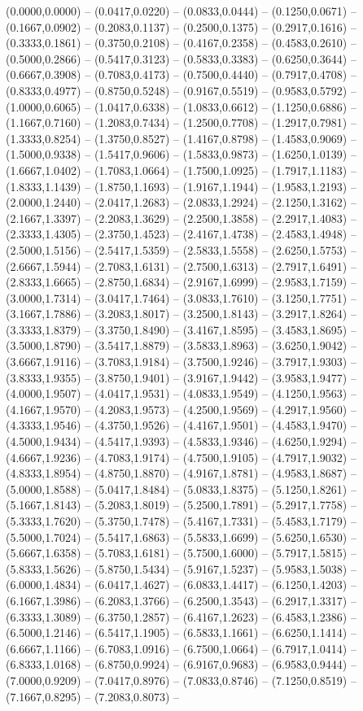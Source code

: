  (0.0000,0.0000) -- (0.0417,0.0220) -- (0.0833,0.0444) -- (0.1250,0.0671) -- (0.1667,0.0902) -- (0.2083,0.1137) -- (0.2500,0.1375) -- (0.2917,0.1616) -- (0.3333,0.1861) -- (0.3750,0.2108) -- (0.4167,0.2358) -- (0.4583,0.2610) -- (0.5000,0.2866) -- (0.5417,0.3123) -- (0.5833,0.3383) -- (0.6250,0.3644) -- (0.6667,0.3908) -- (0.7083,0.4173) -- (0.7500,0.4440) -- (0.7917,0.4708) -- (0.8333,0.4977) -- (0.8750,0.5248) -- (0.9167,0.5519) -- (0.9583,0.5792) -- (1.0000,0.6065) -- (1.0417,0.6338) -- (1.0833,0.6612) -- (1.1250,0.6886) -- (1.1667,0.7160) -- (1.2083,0.7434) -- (1.2500,0.7708) -- (1.2917,0.7981) -- (1.3333,0.8254) -- (1.3750,0.8527) -- (1.4167,0.8798) -- (1.4583,0.9069) -- (1.5000,0.9338) -- (1.5417,0.9606) -- (1.5833,0.9873) -- (1.6250,1.0139) -- (1.6667,1.0402) -- (1.7083,1.0664) -- (1.7500,1.0925) -- (1.7917,1.1183) -- (1.8333,1.1439) -- (1.8750,1.1693) -- (1.9167,1.1944) -- (1.9583,1.2193) -- (2.0000,1.2440) -- (2.0417,1.2683) -- (2.0833,1.2924) -- (2.1250,1.3162) -- (2.1667,1.3397) -- (2.2083,1.3629) -- (2.2500,1.3858) -- (2.2917,1.4083) -- (2.3333,1.4305) -- (2.3750,1.4523) -- (2.4167,1.4738) -- (2.4583,1.4948) -- (2.5000,1.5156) -- (2.5417,1.5359) -- (2.5833,1.5558) -- (2.6250,1.5753) -- (2.6667,1.5944) -- (2.7083,1.6131) -- (2.7500,1.6313) -- (2.7917,1.6491) -- (2.8333,1.6665) -- (2.8750,1.6834) -- (2.9167,1.6999) -- (2.9583,1.7159) -- (3.0000,1.7314) -- (3.0417,1.7464) -- (3.0833,1.7610) -- (3.1250,1.7751) -- (3.1667,1.7886) -- (3.2083,1.8017) -- (3.2500,1.8143) -- (3.2917,1.8264) -- (3.3333,1.8379) -- (3.3750,1.8490) -- (3.4167,1.8595) -- (3.4583,1.8695) -- (3.5000,1.8790) -- (3.5417,1.8879) -- (3.5833,1.8963) -- (3.6250,1.9042) -- (3.6667,1.9116) -- (3.7083,1.9184) -- (3.7500,1.9246) -- (3.7917,1.9303) -- (3.8333,1.9355) -- (3.8750,1.9401) -- (3.9167,1.9442) -- (3.9583,1.9477) -- (4.0000,1.9507) -- (4.0417,1.9531) -- (4.0833,1.9549) -- (4.1250,1.9563) -- (4.1667,1.9570) -- (4.2083,1.9573) -- (4.2500,1.9569) -- (4.2917,1.9560) -- (4.3333,1.9546) -- (4.3750,1.9526) -- (4.4167,1.9501) -- (4.4583,1.9470) -- (4.5000,1.9434) -- (4.5417,1.9393) -- (4.5833,1.9346) -- (4.6250,1.9294) -- (4.6667,1.9236) -- (4.7083,1.9174) -- (4.7500,1.9105) -- (4.7917,1.9032) -- (4.8333,1.8954) -- (4.8750,1.8870) -- (4.9167,1.8781) -- (4.9583,1.8687) -- (5.0000,1.8588) -- (5.0417,1.8484) -- (5.0833,1.8375) -- (5.1250,1.8261) -- (5.1667,1.8143) -- (5.2083,1.8019) -- (5.2500,1.7891) -- (5.2917,1.7758) -- (5.3333,1.7620) -- (5.3750,1.7478) -- (5.4167,1.7331) -- (5.4583,1.7179) -- (5.5000,1.7024) -- (5.5417,1.6863) -- (5.5833,1.6699) -- (5.6250,1.6530) -- (5.6667,1.6358) -- (5.7083,1.6181) -- (5.7500,1.6000) -- (5.7917,1.5815) -- (5.8333,1.5626) -- (5.8750,1.5434) -- (5.9167,1.5237) -- (5.9583,1.5038) -- (6.0000,1.4834) -- (6.0417,1.4627) -- (6.0833,1.4417) -- (6.1250,1.4203) -- (6.1667,1.3986) -- (6.2083,1.3766) -- (6.2500,1.3543) -- (6.2917,1.3317) -- (6.3333,1.3089) -- (6.3750,1.2857) -- (6.4167,1.2623) -- (6.4583,1.2386) -- (6.5000,1.2146) -- (6.5417,1.1905) -- (6.5833,1.1661) -- (6.6250,1.1414) -- (6.6667,1.1166) -- (6.7083,1.0916) -- (6.7500,1.0664) -- (6.7917,1.0414) -- (6.8333,1.0168) -- (6.8750,0.9924) -- (6.9167,0.9683) -- (6.9583,0.9444) -- (7.0000,0.9209) -- (7.0417,0.8976) -- (7.0833,0.8746) -- (7.1250,0.8519) -- (7.1667,0.8295) -- (7.2083,0.8073) -- 